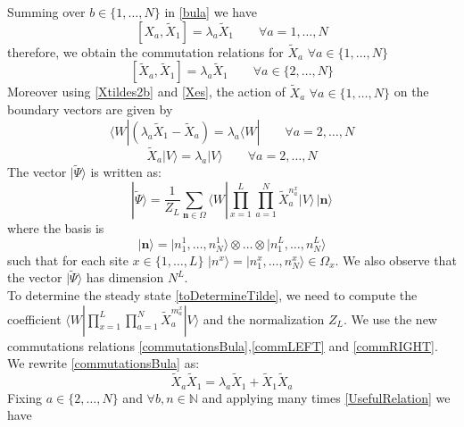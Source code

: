\documentclass[11pt]{article}
\numberwithin{equation}{section}
\numberwithin{equation}{subsection}
\newcommand{\Xt}{\tilde{X}}
\begin{document}
Summing over $b\in \{1,\ldots,N\}$ in \eqref{bula} we have
\begin{equation} 
	\left[X_{a},\Xt_{1}\right]=\lambda_{a}\Xt_{1}\qquad\forall a=1,\ldots,N
\end{equation}
therefore, we obtain the commutation relations for $\Xt_{a}$ $\forall a\in \{1,\ldots,N\}$
\begin{equation}\label{commutationsBula}
	\left[\Xt_{a},\Xt_{1}\right]=\lambda_{a}\Xt_{1}\qquad \forall a\in \{2,\ldots,N\}
\end{equation}
Moreover using \eqref{Xtildes2b} and \eqref{Xes}, the action of $\Xt_{a}$ $\forall a\in \{1,\ldots,N\}$ on the boundary vectors are given by 
\begin{equation}\label{commLEFT}
	\langle W|\left(\lambda_{a}\Xt_{1}-\Xt_{a}\right)=\lambda_{a}\langle W|\qquad\forall a=2,\ldots,N
\end{equation}
\begin{equation}\label{commRIGHT}
	\Xt_{a} |V\rangle= \lambda_{a}|V\rangle\qquad\forall a=2,\ldots,N
\end{equation} 
The vector $|\widetilde{\Psi}\rangle$ is written as:
\begin{equation}\label{toDetermineTilde}
	|\widetilde{\Psi}\rangle = \frac{1}{Z_{L}}\sum_{\mathbf{n}\in \Omega}\langle W|\prod_{x=1}^{L}\prod_{a=1}^{N}\widetilde{X}_{a}^{n_{a}^{x}}
	|V \rangle \,|\mathbf{n}\rangle
\end{equation}
where the basis is 
$$
|\mathbf{n}\rangle =|n_{1}^{1},\ldots,n_{N}^{1}\rangle \otimes \ldots\otimes |n_{1}^{L},\ldots,n_{N}^{L}\rangle
$$
such that for each site $x\in \{1,\ldots,L\}$ $|n^{x}\rangle=|n_{1}^{x},\ldots,n_{N}^{x}\rangle\in \Omega_{x}$. 
We also observe that the vector $|\widetilde{\Psi}\rangle $ has dimension $N^{L}$. \\
To determine the steady state \eqref{toDetermineTilde}, we need to compute the coefficient $\langle W|\prod_{x=1}^{L}\prod_{a=1}^{N}\widetilde{X}_{a}^{m_{a}^{x}}
|V \rangle$ and the normalization $Z_{L}$. We use the new commutations relations \eqref{commutationsBula},\eqref{commLEFT} and \eqref{commRIGHT}.\\
We  rewrite \eqref{commutationsBula} as:
\begin{equation}\label{UsefulRelation}
	\widetilde{X}_{a}\widetilde{X}_{1}=\lambda_{a}\widetilde{X}_{1}+\widetilde{X}_{1}\widetilde{X}_{a}
\end{equation}
Fixing $ a\in \{2,\ldots,N\}$ and $\forall b,n\in \mathbb{N}$ and applying many times \eqref{UsefulRelation} we have
\end{document}
